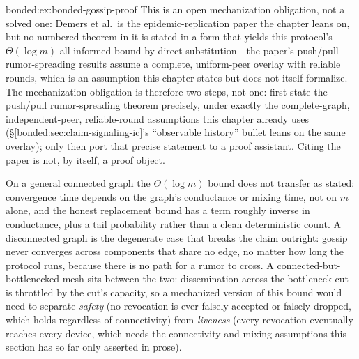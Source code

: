 \begin{pdSolution}{bonded:ex:bonded-gossip-proof}
This is an open mechanization obligation, not a solved one: Demers et al.\ is the epidemic-replication paper the chapter leans on, but no numbered theorem in it is stated in a form that yields this protocol's $\Theta(\log m)$ all-informed bound by direct substitution---the paper's push/pull rumor-spreading results assume a complete, uniform-peer overlay with reliable rounds, which is an assumption this chapter states but does not itself formalize. The mechanization obligation is therefore two steps, not one: first state the push/pull rumor-spreading theorem precisely, under exactly the complete-graph, independent-peer, reliable-round assumptions this chapter already uses (\S\ref{bonded:sec:claim-signaling-ic}'s ``observable history'' bullet leans on the same overlay); only then port that precise statement to a proof assistant. Citing the paper is not, by itself, a proof object.

On a general connected graph the $\Theta(\log m)$ bound does not transfer as stated: convergence time depends on the graph's conductance or mixing time, not on $m$ alone, and the honest replacement bound has a term roughly inverse in conductance, plus a tail probability rather than a clean deterministic count. A disconnected graph is the degenerate case that breaks the claim outright: gossip never converges across components that share no edge, no matter how long the protocol runs, because there is no path for a rumor to cross. A connected-but-bottlenecked mesh sits between the two: dissemination across the bottleneck cut is throttled by the cut's capacity, so a mechanized version of this bound would need to separate \emph{safety} (no revocation is ever falsely accepted or falsely dropped, which holds regardless of connectivity) from \emph{liveness} (every revocation eventually reaches every device, which needs the connectivity and mixing assumptions this section has so far only asserted in prose).
\end{pdSolution}
